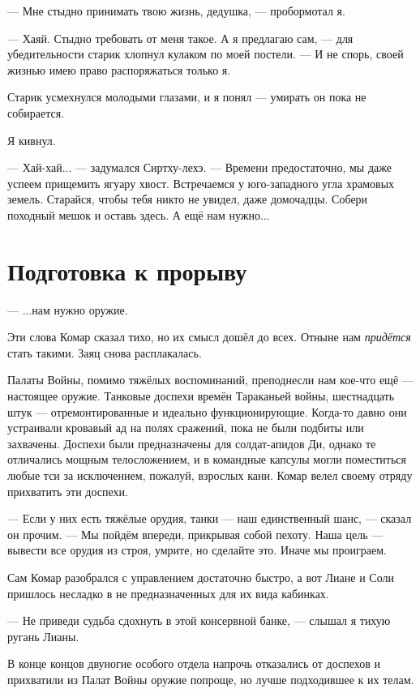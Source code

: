 --- Мне стыдно принимать твою жизнь, дедушка, --- пробормотал я.

--- Хаяй.
Стыдно требовать от меня такое.
А я предлагаю сам, --- для убедительности старик хлопнул кулаком по моей постели.
--- И не спорь, своей жизнью имею право распоряжаться только я.

Старик усмехнулся молодыми глазами, и я понял --- умирать он пока не собирается.

Я кивнул.

--- Хай-хай... --- задумался Сиртху-лехэ.
--- Времени предостаточно, мы даже успеем прищемить ягуару хвост.
Встречаемся у юго-западного угла храмовых земель.
Старайся, чтобы тебя никто не увидел, даже домочадцы.
Собери походный мешок и оставь здесь.
А ещё нам нужно...

\section{Подготовка к прорыву}

--- ...нам нужно оружие.

Эти слова Комар сказал тихо, но их смысл дошёл до всех.
Отныне нам \emph{придётся} стать такими.
Заяц снова расплакалась.

Палаты Войны, помимо тяжёлых воспоминаний, преподнесли нам кое-что ещё --- настоящее оружие.
Танковые доспехи времён Тараканьей войны, шестнадцать штук --- отремонтированные и идеально функционирующие.
Когда-то давно они устраивали кровавый ад на полях сражений, пока не были подбиты или захвачены.
Доспехи были предназначены для солдат-апидов Ди, однако те отличались мощным телосложением, и в командные капсулы могли поместиться любые тси за исключением, пожалуй, взрослых кани.
Комар велел своему отряду прихватить эти доспехи.

--- Если у них есть тяжёлые орудия, танки --- наш единственный шанс, --- сказал он прочим.
--- Мы пойдём впереди, прикрывая собой пехоту.
Наша цель --- вывести все орудия из строя, умрите, но сделайте это.
Иначе мы проиграем.

Сам Комар разобрался с управлением достаточно быстро, а вот Лиане и Соли пришлось несладко в не предназначенных для их вида кабинках.

--- Не приведи судьба сдохнуть в этой консервной банке, --- слышал я тихую ругань Лианы.

В конце концов двуногие особого отдела напрочь отказались от доспехов и прихватили из Палат Войны оружие попроще, но лучше подходившее к их телам.

